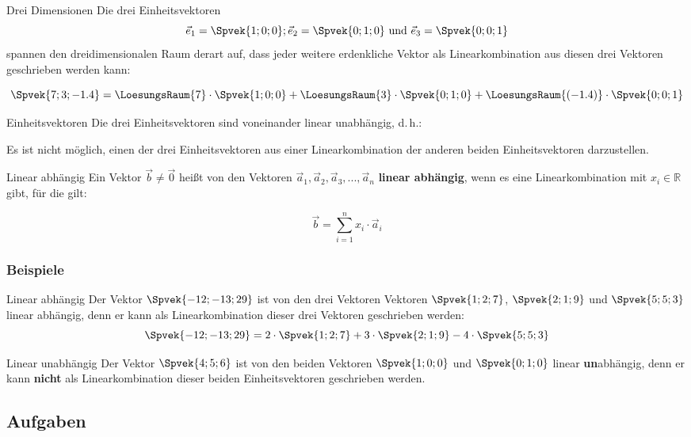 \begin{bemerkung}{Drei Dimensionen}{}
  Die drei Einheitsvektoren
  $$\vec{e}_1=\Spvek{1;0;0} ;
  \vec{e}_2=\Spvek{0;1;0} \text{ und }
  \vec{e}_3=\Spvek{0;0;1}$$
spannen den dreidimensionalen Raum derart auf, dass jeder weitere
erdenkliche Vektor als
Linearkombination aus diesen drei Vektoren geschrieben werden kann:

$$\Spvek{7;3;-1.4} = 
  \LoesungsRaum{  7   }\cdot{}\Spvek{1;0;0} + 
  \LoesungsRaum{  3   }\cdot{}\Spvek{0;1;0} +
  \LoesungsRaum{(-1.4)}\cdot{}\Spvek{0;0;1}$$
\end{bemerkung}

\begin{gesetz}{Einheitsvektoren}{}
  Die drei Einheitsvektoren sind voneinander linear unabhängig, d.\,h.:

  Es ist nicht möglich, einen der drei Einheitsvektoren aus einer
  Linearkombination der anderen beiden Einheitsvektoren darzustellen.
\end{gesetz}

\begin{definition}{Linear abhängig}{}
  Ein Vektor $\vec{b}\ne \vec{0}$ heißt von den Vektoren $\vec{a}_1, \vec{a}_2,
  \vec{a}_3, ... , \vec{a}_n$ \textbf{linear abhängig}, wenn es eine
  Linearkombination mit $x_i \in \mathbb{R}$ gibt, für die gilt:

  $$\vec{b} = \sum_{i=1}^{n}x_i\cdot{}\vec{a}_i$$
  \end{definition}
\newpage
\subsubsection{Beispiele}%

\begin{beispiel}{Linear abhängig}{}
  Der Vektor $\Spvek{-12;-13;29}$ ist von den drei Vektoren 
    Vektoren $\Spvek{1;2;7}$, $\Spvek{2;1;9}$
    und $\Spvek{5;5;3}$  linear abhängig, denn
      er kann als Linearkombination dieser drei
      Vektoren geschrieben werden:
      $$\Spvek{-12;-13;29} = 2\cdot{}\Spvek{1;2;7} + 3\cdot{}
      \Spvek{2;1;9} -4\cdot{} \Spvek{5;5;3}$$
\end{beispiel}

\begin{beispiel}{Linear unabhängig}{}
  Der Vektor $\Spvek{4;5;6}$ ist von den beiden
    Vektoren $\Spvek{1;0;0}$
    und $\Spvek{0;1;0}$  linear \textbf{un}abhängig, denn
      er kann \textbf{nicht} als Linearkombination dieser beiden
      Einheitsvektoren geschrieben werden.
\end{beispiel}

\subsection*{Aufgaben}
